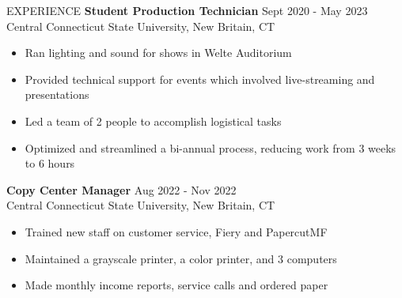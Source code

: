 \documentclass{resume}
\begin{document}
\begin{rSection}{EXPERIENCE}
	\textbf{Student Production Technician} \hfill {Sept 2020 - May 2023}\\ %
	Central Connecticut State University, New Britain, CT
	\begin{itemize}
		\setlength{\itemsep}{-3pt}
		\item Ran lighting and sound for shows in Welte Auditorium
		\item Provided technical support for events which involved live-streaming and presentations
		\item Led a team of 2 people to accomplish logistical tasks
		\item Optimized and streamlined a bi-annual process, reducing work from 3 weeks to 6 hours
	\end{itemize}
	
	\textbf{Copy Center Manager} \hfill {Aug 2022 - Nov 2022}\\ %
	Central Connecticut State University, New Britain, CT
	\begin{itemize}
		\setlength{\itemsep}{-3pt}
		\item Trained new staff on customer service, Fiery and PapercutMF
		\item Maintained a grayscale printer, a color printer, and 3 computers
		\item Made monthly income reports, service calls and ordered paper
	 \end{itemize}
\end{rSection}
\end{document}
